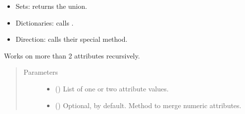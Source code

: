 \documentclass[letterpaper,10pt,english]{sphinxmanual}
\begin{document}
\begin{fulllineitems}
\begin{fulllineitems}
\begin{itemize}
\item {} 
Sets: returns the union.

\item {} 
Dictionaries: calls .

\item {} 
Direction: calls their special
{\hyperref[\detokenize{reference:pypath.main.Direction.merge}]{}} method.

\end{itemize}

Works on more than 2 attributes recursively.
\begin{quote}\begin{description}
\item[{Parameters}] \leavevmode\begin{itemize}
\item {} 
 () \textendash{} List of one or two attribute values.

\item {} 
 () \textendash{} Optional,  by default. Method to merge numeric
attributes.

\end{itemize}

\end{description}\end{quote}

\end{fulllineitems}


\begin{fulllineitems}
\label{\detokenize{reference:pypath.main.PyPath.communities}}
\end{fulllineitems}


\begin{fulllineitems}
\label{\detokenize{reference:pypath.main.PyPath.complex_comembership_network}}
\end{fulllineitems}


\end{fulllineitems}
\end{document}
